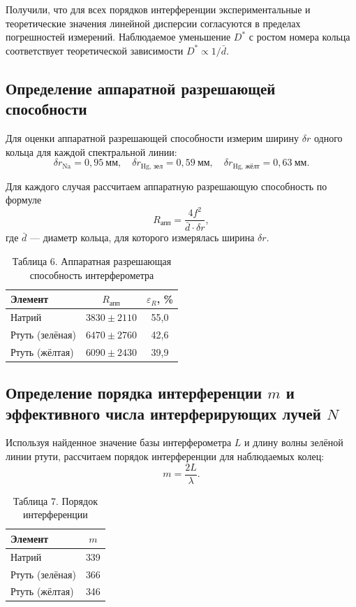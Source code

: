 \documentclass[a4paper]{article}
\begin{document}
\begin{enumerate}
Получили, что для всех порядков интерференции экспериментальные и теоретические значения линейной дисперсии согласуются в пределах погрешностей измерений. Наблюдаемое уменьшение $D^*$ с ростом номера кольца соответствует теоретической зависимости $D^* \propto 1/\bar{d}$.

\subsection{Определение аппаратной разрешающей способности}

Для оценки аппаратной разрешающей способности измерим ширину $\delta r$ одного кольца для каждой спектральной линии:
\[
\delta r_{\text{Na}} = 0{,}95~\text{мм}, \quad \delta r_{\text{Hg, зел}} = 0{,}59~\text{мм}, \quad \delta r_{\text{Hg, жёлт}} = 0{,}63~\text{мм}.
\]

Для каждого случая рассчитаем аппаратную разрешающую способность по формуле
\[
R_{\text{апп}} = \frac{4 f^2}{\bar{d} \cdot \delta r},
\]
где $\bar{d}$ --- диаметр кольца, для которого измерялась ширина $\delta r$. 

\begin{table}[h!]
    \centering
    \begin{tabular}{|l|c|c|}
        \hline
        Элемент & $R_{\text{апп}}$ & $\varepsilon_{R}$, \% \\ \hline
        Натрий & $3830 \pm 2110$ & 55{,}0 \\ \hline
        Ртуть (зелёная) & $6470 \pm 2760$ & 42{,}6 \\ \hline
        Ртуть (жёлтая) & $6090 \pm 2430$ & 39{,}9 \\ \hline
    \end{tabular}
    \caption{Таблица 6. Аппаратная разрешающая способность интерферометра}
    \label{tab:r_app}
\end{table}

\subsection{Определение порядка интерференции $m$ и эффективного числа интерферирующих лучей $N$}

Используя найденное значение базы интерферометра $L$ и длину волны зелёной линии ртути, рассчитаем порядок интерференции для наблюдаемых колец:
\[
m = \frac{2L}{\lambda}.
\]

\begin{table}[h!]
    \centering
    \begin{tabular}{|l|c|}
        \hline
        Элемент & $m$ \\ \hline
        Натрий & 339 \\ \hline
        Ртуть (зелёная) & 366 \\ \hline
        Ртуть (жёлтая) & 346 \\ \hline
    \end{tabular}
    \caption{Таблица 7. Порядок интерференции}
    \label{tab:m}
\end{table}



\end{enumerate}
\end{document}
